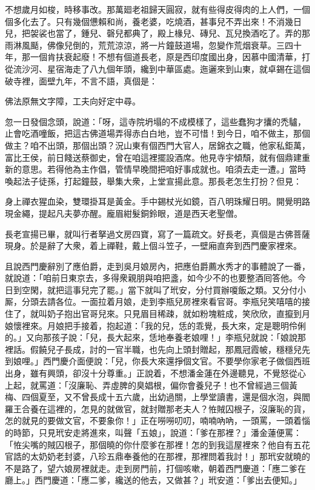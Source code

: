 不想歲月如梭，時移事改。那萬廻老祖歸天圓寂，就有些得皮得肉的上人們，一個個多化去了。只有幾個憊賴和尚，養老婆，吃燒酒，{}甚事兒不弄出來！不消幾日兒，把袈裟也當了，鍾兒、磬兒都典了，殿上椽兒、磚兒、瓦兒換酒吃了。弄的那雨淋風颳，佛像兒倒的，荒荒涼涼，將一片鐘鼓道場，忽變作荒烟衰草。三四十年，那一個肯扶衰起廢！不想有個道長老，原是西印度國出身，因慕中國清華，打從流沙河、星宿海走了八九個年頭，纔到中華區處。迤邐來到山東，就卓錫在這個破寺裡，面壁九年，不言不語，{}真個是：

佛法原無文字障，工夫向好定中尋。

忽一日發個念頭，說道：「呀，這寺院坍塌的不成模樣了，這些蠢狗才攮的禿驢，止會吃酒噇飯，把這古佛道場弄得赤白白地，豈不可惜！到今日，咱不做主，那個做主？咱不出頭，那個出頭？況山東有個西門大官人，居錦衣之職，他家私鉅萬，富比王侯，前日餞送蔡御史，曾在咱這裡擺設酒席。他見寺宇傾頹，就有個鼎建重新的意思。若得他為主作倡，管情早晚間把咱好事成就也。咱須去走一遭。」當時喚起法子徒孫，打起鐘鼓，舉集大衆，上堂宣揚此意。那長老怎生打扮？但見：

身上禪衣猩血染，雙環掛耳是黃金。手中錫杖光如鏡，百八明珠耀日明。開覺明路現金繩，提起凡夫夢亦醒。龐眉紺髮銅鈴眼，道是西天老聖僧。

長老宣揚已畢，就叫行者拏過文房四寶，寫了一篇疏文。好長老，真個是古佛菩薩現身。於是辭了大衆，着上禪鞋，戴上個斗笠子，一壁廂直奔到西門慶家裡來。

且說西門慶辭別了應伯爵，走到吳月娘房內，把應伯爵薦水秀才的事體說了一番，就說道：「咱前日東京去，多得衆親朋與咱把盞，如今少不的也要整酒囘答他。今日到空閑，就把這事兒完了罷。」當下就叫了玳安，分付買辦嗄飯之類。又分付小厮，分頭去請各位。一面拉着月娘，走到李瓶兒房裡來看官哥。李瓶兒笑嘻嘻的接住了，就叫奶子抱出官哥兒來。只見眉目稀疎，就如粉塊粧成，笑欣欣，直攛到月娘懷裡來。月娘把手接着，抱起道：「我的兒，恁的乖覺，長大來，定是聰明伶俐的。」又向那孩子說：「兒，長大起來，恁地奉養老娘哩！」李瓶兒就說：「娘說那裡話。假饒兒子長成，討的一官半職，也先向上頭封贈起，那鳳冠霞帔，穩穩兒先到娘哩。」{}西門慶介面便說：「兒，你長大來還掙個文官。不要學你家老子做個西班出身，雖有興頭，卻沒十分尊重。」{}正說着，不想潘金蓮在外邊聽見，不覺怒從心上起，{}就罵道：「沒廉恥、弄虛脾的臭娼根，偏你會養兒子！也不曾經過三個黃梅、四個夏至，又不曾長成十五六歲，出幼過關，上學堂讀書，還是個水泡，與閻羅王合養在這裡的，怎見的就做官，就封贈那老夫人？恠賊囚根子，沒廉恥的貨，怎的就見的要做文官，不要象你！」{}正在嘮嘮叨叨，喃喃吶吶，一頭罵，一頭着惱的時節，只見玳安走將進來，叫聲「五娘」，說道：「爹在那裡？」潘金蓮便罵：「恠尖嘴的賊囚根子，那個曉的你什麼爹在那裡！怎的到我這屋裡來？他自有五花官誥的太奶奶老封婆，八珍五鼎奉養他的在那裡，{}那裡問着我討！」那玳安就曉的不是路了，望六娘房裡就走。{}走到房門前，打個咳嗽，朝着西門慶道：「應二爹在廳上。」西門慶道：「應二爹，纔送的他去，又做甚？」玳安道：「爹出去便知。」

